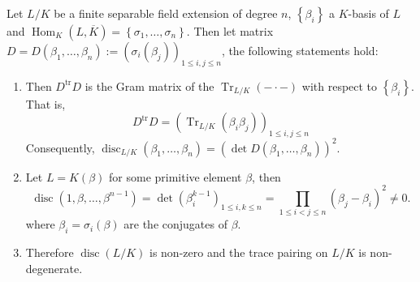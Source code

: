 \documentclass[12pt, oneside]{book}
\begin{document}
\begin{proposition}
    Let $L / K$ be a finite separable field extension of degree $n$, $\left\{\beta_i\right\}$ a $K$-basis of $L$ and $\operatorname{Hom}_K(L, \overline{K})=\left\{\sigma_1, \ldots, \sigma_n\right\}$.
    Then let matrix $D=D\left(\beta_1,\ldots,\beta_n\right):=\left(\sigma_i\left(\beta_j\right)\right)_{1 \leq i, j \leq n}$, the following statements hold:
    \begin{enumerate}
        \item
              Then $D^{\operatorname{tr}} D$ is the Gram matrix of the $\operatorname{Tr}_{L / K}(- \cdot -)$ with respect to $\left\{\beta_i\right\}$.
              That is,
              \begin{equation*}
                  D^{\operatorname{tr}} D=\left(\operatorname{Tr}_{L / K}\left(\beta_i \beta_j\right)\right)_{1 \leq i, j \leq n}
              \end{equation*}
              Consequently, $\operatorname{disc}_{L/K}\left(\beta_1, \ldots, \beta_n\right)=\left(\operatorname{det} D\left(\beta_1, \ldots, \beta_n\right)\right)^2$.

        \item
              Let $L=K(\beta)$ for some primitive element $\beta$, then
              \begin{equation*}
                  \operatorname{disc}\left(1, \beta, \ldots, \beta^{n-1}\right)
                  =
                  \det\left(\beta_i^{k-1}\right)_{1 \leq i, k \leq n}
                  =
                  \prod_{1 \leq i<j \leq n}\left(\beta_j-\beta_i\right)^2\neq 0 .
              \end{equation*}
              where $\beta_i=\sigma_i(\beta)$ are the conjugates of $\beta$.


        \item
              Therefore $\operatorname{disc}\left(L/K\right)$ is non-zero and the trace pairing on $L / K$ is non-degenerate.
    \end{enumerate}
\end{proposition}
\end{document}
